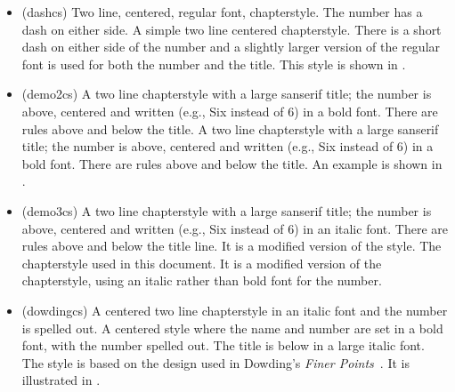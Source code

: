 \begin{itemize}
\item[\cstyle{dash}]
\glossary(dashcs)%
  {}%
  {Two line, centered, regular font, chapterstyle. The number has a dash on 
   either side.}
 A simple two line centered chapterstyle. There is a short
dash on either side of the number and a slightly larger
version of the regular font is used for both the number and the title.
This style is shown in .



\item[\cstyle{demo2}]
\glossary(demo2cs)%
  {}%
  {A two line chapterstyle with a large sanserif title; the number is above, 
   centered and written (e.g., Six instead of 6) in a bold font. 
   There are rules above and below the title.}
   A two line chapterstyle with a large sanserif title; the number is above, 
   centered and written (e.g., Six instead of 6) in a bold font. 
   There are rules above and below the title. An example is shown in 
  .



\item[\cstyle{demo3}]
\glossary(demo3cs)%
  {}%
  {A two line chapterstyle with a large sanserif title; the number is above, 
   centered and written (e.g., Six instead of 6) in an italic font. 
   There are rules above and below
   the title line. It is a modified version of the  style.}
   The chapterstyle used in this document. It is a
  modified version of the  chapterstyle, using an italic
  rather than bold font for the number.

\item[\cstyle{dowding}] 
\glossary(dowdingcs)%
  {}%
  { A centered two line chapterstyle in an italic font and the number
   is spelled out.}
A centered style where the name and number are set in a bold font, with the 
number spelled out. The title is below in a large italic font. The style
is based on the design used in Dowding's \textit{Finer Points}~\cite{DOWDING96}.
It is illustrated in 
.


\end{itemize}
